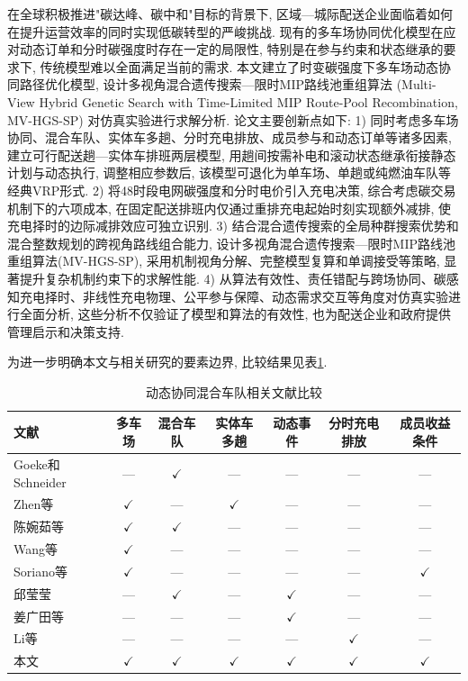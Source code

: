 \documentclass{setp-new}
\newcommand{\setptabsetup}{\fontsize{9pt}{10.5pt}\selectfont\renewcommand{\arraystretch}{0.95}\setlength{\tabcolsep}{2.2pt}\setlength{\aboverulesep}{0.4pt}\setlength{\belowrulesep}{0.4pt}\hbadness=10000}
\begin{document}
在全球积极推进"碳达峰、碳中和"目标的背景下,
区域—城际配送企业面临着如何在提升运营效率的同时实现低碳转型的严峻挑战.
现有的多车场协同优化模型在应对动态订单和分时碳强度时存在一定的局限性,
特别是在参与约束和状态继承的要求下, 传统模型难以全面满足当前的需求.
本文建立了时变碳强度下多车场动态协同路径优化模型,
设计多视角混合遗传搜索—限时MIP路线池重组算法
(Multi-View Hybrid Genetic Search with Time-Limited MIP Route-Pool Recombination, MV-HGS-SP)
对仿真实验进行求解分析.
论文主要创新点如下:
1) 同时考虑多车场协同、混合车队、实体车多趟、分时充电排放、成员参与和动态订单等诸多因素,
建立可行配送趟—实体车排班两层模型,
用趟间按需补电和滚动状态继承衔接静态计划与动态执行,
调整相应参数后, 该模型可退化为单车场、单趟或纯燃油车队等经典VRP形式.
2) 将48时段电网碳强度和分时电价引入充电决策, 综合考虑碳交易机制下的六项成本,
在固定配送排班内仅通过重排充电起始时刻实现额外减排,
使充电择时的边际减排效应可独立识别.
3) 结合混合遗传搜索的全局种群搜索优势和混合整数规划的跨视角路线组合能力,
设计多视角混合遗传搜索—限时MIP路线池重组算法(MV-HGS-SP),
采用机制视角分解、完整模型复算和单调接受等策略, 显著提升复杂机制约束下的求解性能.
4) 从算法有效性、责任错配与跨场协同、碳感知充电择时、非线性充电物理、公平参与保障、动态需求交互等角度对仿真实验进行全面分析,
这些分析不仅验证了模型和算法的有效性,
也为配送企业和政府提供管理启示和决策支持.

为进一步明确本文与相关研究的要素边界, 比较结果见表\ref{tab:literature-comparison}.

\begin{table}[H]
\centering
\caption{动态协同混合车队相关文献比较}
\label{tab:literature-comparison}
\setptabsetup
\begin{tabular*}{\linewidth}{@{\extracolsep{\fill}}lcccccc@{}}
\toprule
文献 & 多车场 & 混合车队 & 实体车多趟 & 动态事件 & 分时充电排放 & 成员收益条件\\
\midrule
Goeke和Schneider\cite{ref:27} & --- & $\checkmark$ & --- & --- & --- & ---\\
Zhen等\cite{ref:44} & $\checkmark$ & --- & $\checkmark$ & --- & --- & ---\\
陈婉茹等\cite{ref:23} & $\checkmark$ & $\checkmark$ & --- & --- & --- & ---\\
Wang等\cite{ref:7} & $\checkmark$ & --- & --- & --- & --- & ---\\
Soriano等\cite{ref:8} & $\checkmark$ & --- & --- & --- & --- & $\checkmark$\\
邱莹莹\cite{ref:71} & --- & $\checkmark$ & --- & $\checkmark$ & --- & ---\\
姜广田等\cite{ref:51} & --- & --- & --- & $\checkmark$ & --- & ---\\
Li等\cite{ref:52} & --- & --- & --- & --- & $\checkmark$ & ---\\
本文 & $\checkmark$ & $\checkmark$ & $\checkmark$ & $\checkmark$ & $\checkmark$ & $\checkmark$\\
\bottomrule
\end{tabular*}
\end{table}
\end{document}
